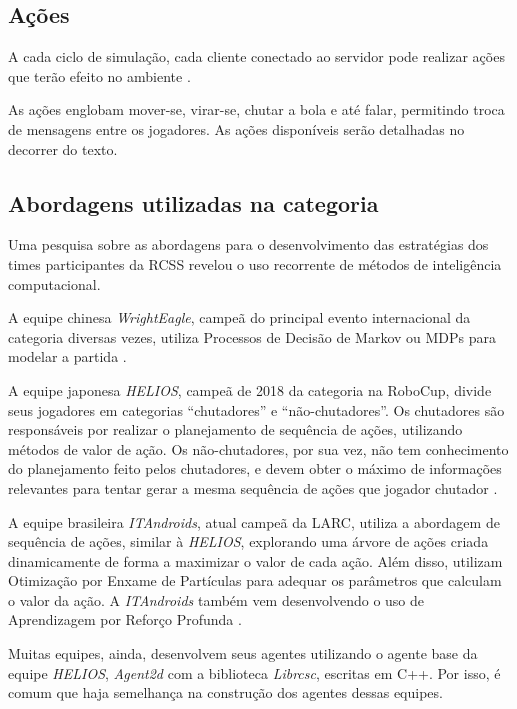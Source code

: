\subsection{Ações}
\label{sec:actions}

A cada ciclo de simulação, cada cliente conectado ao servidor pode realizar ações que terão efeito no ambiente \cite{rcssmanual2003}.

As ações englobam mover-se, virar-se, chutar a bola e até falar, permitindo troca de mensagens entre os jogadores. As ações disponíveis serão detalhadas no decorrer do texto.


\subsection{Abordagens utilizadas na categoria}
\label{subsec:abordagens}
\par Uma pesquisa sobre as abordagens para o desenvolvimento das estratégias dos times participantes da RCSS revelou o uso recorrente de métodos de inteligência computacional.
\par A equipe chinesa \textit{WrightEagle}, campeã do principal evento internacional da categoria diversas vezes, utiliza Processos de Decisão de Markov ou MDPs para modelar a partida \cite{bai2015online}.
\par A equipe japonesa \textit{HELIOS}, campeã de 2018 da categoria na RoboCup, divide seus jogadores em categorias ``chutadores'' e ``não-chutadores''.
Os chutadores são responsáveis por realizar o planejamento de sequência de ações, utilizando métodos de valor de ação.
Os não-chutadores, por sua vez, não tem conhecimento do planejamento feito pelos chutadores, e devem obter o máximo de informações relevantes para tentar gerar a mesma sequência de ações que jogador chutador \cite{nakashima2018helios2018}.
\par A equipe brasileira \textit{ITAndroids}, atual campeã da LARC, utiliza a abordagem de sequência de ações, similar à \textit{HELIOS}, explorando uma árvore de ações criada dinamicamente de forma a maximizar o valor de cada ação. Além disso, utilizam Otimização por Enxame de Partículas \cite{melloitandroids} para adequar os parâmetros que calculam o valor da ação. A \textit{ITAndroids} também vem desenvolvendo o uso de Aprendizagem por Reforço Profunda \cite{maximoitandroids}.
\par Muitas equipes, ainda, desenvolvem seus agentes utilizando o agente base da equipe \textit{HELIOS}, \textit{Agent2d} com a biblioteca \textit{Librcsc}, escritas em C++. Por isso, é comum que haja semelhança na construção dos agentes dessas equipes.

